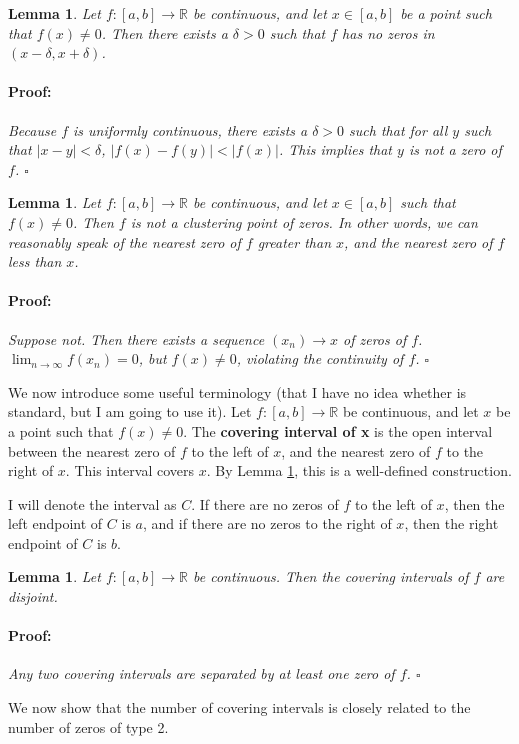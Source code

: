 \documentclass{article}
\newenvironment{proof}{\paragraph{Proof:}}{\hfill$\square$}
\newtheorem{lemma}[theorem]{Lemma}
\newcommand{\R}{\mathbb{R}}
\begin{document}
\begin{lemma}
\label{ExclusionZoneDelta}
Let $f: [a, b] \rightarrow \R$ be continuous, and let $x \in [a, b]$ be a point such that $f(x) \neq 0$. Then there exists a $\delta > 0$ such that $f$ has no zeros in $(x-\delta, x+\delta)$.
\begin{proof}
Because $f$ is uniformly continuous, there exists a $\delta > 0$ such that for all $y$ such that $|x-y| < \delta$, $|f(x) - f(y)| < |f(x)|$. This implies that $y$ is not a zero of $f$.
\end{proof}
\end{lemma}

\begin{lemma}
\label{LemmaType2NotCluster}
Let $f: [a, b] \rightarrow \R$ be continuous, and let $x \in [a, b]$ such that $f(x) \neq 0$. Then $f$ is not a clustering point of zeros. In other words, we can reasonably speak of the nearest zero of $f$ greater than $x$, and the nearest zero of $f$ less than $x$.
\begin{proof}
Suppose not. Then there exists a sequence $(x_n) \rightarrow x$ of zeros of $f$. $\lim_{n \rightarrow \infty} f(x_n) = 0$, but $f(x) \neq 0$, violating the continuity of $f$.
\end{proof}
\end{lemma}

We now introduce some useful terminology (that I have no idea whether is standard, but I am going to use it). Let $f: [a, b] \rightarrow \R$ be continuous, and let $x$ be a point such that $f(x) \neq 0$. The \textbf{covering interval of x} is the open interval between the nearest zero of $f$ to the left of $x$, and the nearest zero of $f$ to the right of $x$. This interval covers $x$. By Lemma \ref{LemmaType2NotCluster}, this is a well-defined construction.

I will denote the interval as $C$. If there are no zeros of $f$ to the left of $x$, then the left endpoint of $C$ is $a$, and if there are no zeros to the right of $x$, then the right endpoint of $C$ is $b$.

\begin{lemma}
Let $f: [a, b] \rightarrow \R$ be continuous. Then the covering intervals of $f$ are disjoint.
\begin{proof}
Any two covering intervals are separated by at least one zero of $f$.
\end{proof}
\end{lemma}

We now show that the number of covering intervals is closely related to the number of zeros of type 2.
\end{document}
